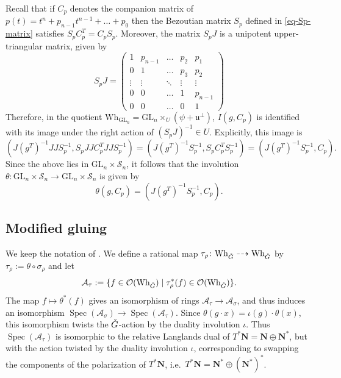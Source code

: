 \documentclass[11pt]{article}
\theoremstyle{definition}
\theoremstyle{plain}
\theoremstyle{remark}
\newcommand{\GL}{\mathrm{GL}}
\DeclareMathOperator{\spec}{Spec}
\begin{document}
            Recall that if $C_p$ denotes the companion matrix of $p(t) = t^n + p_{n-1}t^{n-1} + \dots + p_0$ then the Bezoutian matrix $S_p$ defined in \eqref{eq-Sp-matrix} satisfies $S_pC_p^T = C_pS_p$. Moreover, the matrix $S_pJ$ is a unipotent upper-triangular matrix, given by
            \[
                S_pJ =
                \begin{pmatrix}
                    1 & p_{n-1} & \dots & p_2 & p_1 \\
                    0 & 1 & \dots & p_3 & p_2 \\
                    \vdots & \vdots & \ddots & \vdots & \vdots \\
                    0 & 0 & \dots & 1 & p_{n-1} \\
                    0 & 0 & \dots & 0 & 1
                \end{pmatrix}
            \]
            Therefore, in the quotient $\mathrm{Wh}_{\GL_n} = \GL_n \times_U (\psi + \mathfrak{u}^\perp)$, $I(g,C_p)$ is identified with its image under the right action of $(S_pJ)^{-1} \in U$. Explicitly, this image is
            \[
                (J(g^T)^{-1}JJS_p^{-1}, S_pJJC_p^TJJS_p^{-1}) = (J(g^T)^{-1}S_p^{-1}, S_pC_p^TS_p^{-1}) = (J(g^T)^{-1}S_p^{-1}, C_p).
            \]
            Since the above lies in $\GL_n \times \mathcal{S}_n$, it follows that the involution $\theta\colon \GL_n \times \mathcal{S}_n \to \GL_n \times \mathcal{S}_n$ is given by
            \begin{equation}\label{eq-involution-GLn}
                \theta(g,C_p) = (J(g^T)^{-1}S_p^{-1},C_p).
            \end{equation}

        \subsection{Modified gluing}

        We keep the notation of . We define a rational map $\tau_\rho\colon \mathrm{Wh}_{\Check{G}} \dashrightarrow \mathrm{Wh}_{\Check{G}}$ by $\tau_\rho := \theta \circ \sigma_\rho$ and let
        \[
            \mathcal{A}_\tau := \{f \in \mathcal{O}(\mathrm{Wh}_{\Check{G}}) \mid \tau_{\rho}^*(f) \in \mathcal{O}(\mathrm{Wh}_{\Check{G}})\}.
        \]       
        The map $f \mapsto \theta^*(f)$ gives an isomorphism of rings $\mathcal{A}_\tau \to \mathcal{A}_\sigma$, and thus induces an isomorphism $\spec(\mathcal{A}_{\sigma}) \to \spec(\mathcal{A}_\tau)$. Since $\theta(g \cdot x) = \iota(g) \cdot \theta(x)$, this isomorphism twists the $\Check{G}$-action by the duality involution $\iota$. Thus $\spec(\mathcal{A}_\tau)$ is isomorphic to the relative Langlands dual of $T^*\mathbf{N} = \mathbf{N} \oplus\mathbf{N}^*$, but with the action twisted by the duality involution $\iota$, corresponding to swapping the components of the polarization of $T^*\mathbf{N}$, i.e.\ $T^*\mathbf{N} = \mathbf{N}^* \oplus (\mathbf{N}^*)^*$.
        
\end{document}
